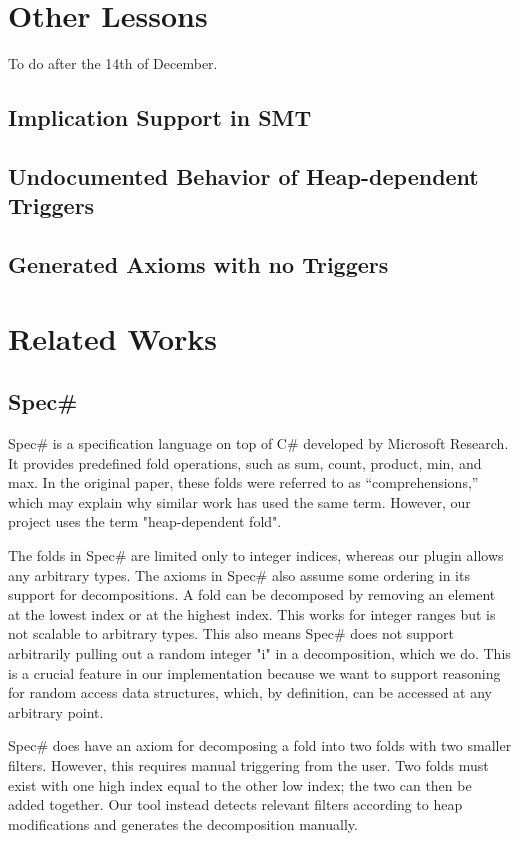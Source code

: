 \documentclass[msc,oneside]{ubcthesis}
\theoremstyle{definition}
\begin{document}
\chapter{Other Lessons}
To do after the 14th of December. 

\section{Implication Support in SMT}

\section{Undocumented Behavior of Heap-dependent Triggers}

\section{Generated Axioms with no Triggers}

\chapter{Related Works}
	

\section{Spec\#}
Spec\# is a specification language on top of C\# developed by Microsoft Research. It provides predefined fold operations, such as sum, count, product, min, and max. In the original paper, these folds were referred to as ``comprehensions,'' which may explain why similar work has used the same term. However, our project uses the term "heap-dependent fold".

The folds in Spec\# are limited only to integer indices, whereas our plugin allows any arbitrary types. The axioms in Spec\# also assume some ordering in its support for decompositions. A fold can be decomposed by removing an element at the lowest index or at the highest index. This works for integer ranges but is not scalable to arbitrary types. This also means Spec\# does not support arbitrarily pulling out a random integer "i" in a decomposition, which we do. This is a crucial feature in our implementation because we want to support reasoning for random access data structures, which, by definition, can be accessed at any arbitrary point.

Spec\# does have an axiom for decomposing a fold into two folds with two smaller filters. However, this requires manual triggering from the user. Two folds must exist with one high index equal to the other low index; the two can then be added together. Our tool instead detects relevant filters according to heap modifications and generates the decomposition manually.    
\end{document}
